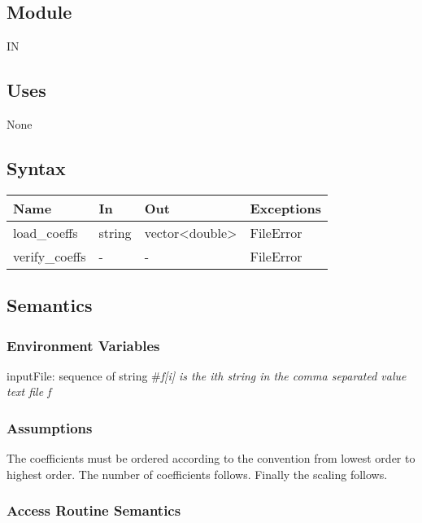 \documentclass[12pt, titlepage]{article}
\begin{document}
\subsection{Module}

IN

\subsection{Uses}

None

\subsection{Syntax}

\begin{tabular}{p{3cm} p{2cm} p{4cm} >{\raggedright\arraybackslash}p{9cm}}
\toprule
\textbf{Name} & \textbf{In} & \textbf{Out} & \textbf{Exceptions} \\
\midrule
load\_coeffs & string & vector<double> &  FileError \\
verify\_coeffs & - & - & FileError \\
\bottomrule
\end{tabular}

\subsection{Semantics}

\subsubsection{Environment Variables}

inputFile: sequence of string \#\textit{f[i] is the ith string in the comma separated value text file f}\\ 

\subsubsection{Assumptions}

The coefficients must be ordered according to the convention from lowest order to highest order.
The number of coefficients follows. Finally the scaling follows.

\subsubsection{Access Routine Semantics}
\end{document}
